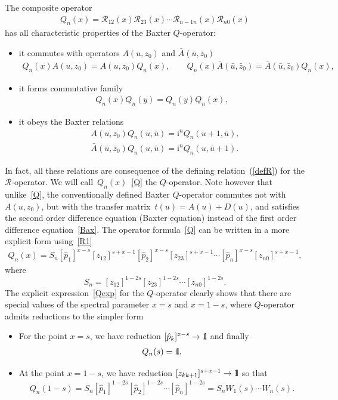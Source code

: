 \documentclass[pdftex]{sigma}
\renewcommand{\imath}{\mathrm{i}}
\newcommand{\II}{\hbox{{1}\kern-.25em\hbox{l}}}
\numberwithin{equation}{section}
\begin{document}
The composite operator
\begin{align}\label{Q}
Q_n(x) =
\mathcal{R}_{12}(x) \mathcal{R}_{23}(x)\cdots
\mathcal{R}_{n-1 n}(x) \mathcal{R}_{n 0}(x)
\end{align}
has all characteristic properties of the Baxter $Q$-operator:
\begin{itemize}\itemsep=0pt
\item
it commutes with operators $A(u,z_0)$ and
$\bar{A}(\bar{u},\bar{z}_0)$
\begin{align}\label{comQA}
Q_n(x) A(u,z_0) = A(u,z_0) Q_n(x) ,\qquad
Q_n(x) \bar{A}(\bar{u},\bar{z}_0) =
\bar{A}(\bar{u},\bar{z}_0) Q_n(x),
\end{align}
\item it forms commutative family
\begin{align}\label{comQQ}
Q_n(x) Q_n(y) = Q_n(y) Q_n(x),
\end{align}
\item it obeys the Baxter relations
\begin{align}\label{Bax}
&A(u,z_0) Q_n(u,\bar{u}) = \imath^n Q_n(u+1,\bar{u}),
\\
\label{Baxbar}
&\bar{A}(\bar{u},\bar{z}_0) Q_n(u,\bar{u}) = \imath^n Q_n(u,\bar{u}+1).
\end{align}
\end{itemize}
In fact, all these relations are consequence of the defining
relation~(\ref{defR}) for the $\mathcal{R}$-operator.
We will call~$Q_n(x)$~\eqref{Q} the $Q$-operator.
Note however that unlike~\eqref{Q}, the conventionally defined Baxter $Q$-operator commutes not with~$A(u,z_0)$, but with the transfer matrix~$t(u)=A(u)+D(u)$,
and satisfies the second order difference equation (Baxter equation) instead of the first order difference equation~\eqref{Bax}.
The operator formula~\eqref{Q} can be written in a more explicit form using~\eqref{R1}
\begin{align}\label{Qexp}
Q_n( x) = S_n
[\hat{p}_1]^{x-s} [z_{12}]^{s+x-1}
[\hat{p}_2]^{x-s} [z_{23}]^{s+x-1}
\cdots
[\hat{p}_n]^{x-s} [z_{n0}]^{s+x-1},
\end{align}
where
\begin{equation} \label{Sn}
S_n = [z_{12}]^{1-2s} [z_{23}]^{1-2s}
\cdots [z_{n0}]^{1-2s} .
\end{equation}
The explicit expression~\eqref{Qexp} for the $Q$-operator
clearly shows that there are special values of the spectral
parameter $x=s$ and $x=1-s$, where $Q$-operator admits
reductions to the simpler form
\begin{itemize}\itemsep=0pt
\item For the point $x=s$, we have reduction $[\hat{p}_k]^{x-s} \to \II$ and finally
\begin{align*}
Q_n(s) = \II.
\end{align*}
\item
At the point $x=1-s$, we have reduction $[z_{k k+1}]^{s+x-1}\to \II$ so that
\begin{align}\label{Q_1-s}
Q_n(1-s) = S_n
[\hat{p}_1]^{1-2s}
[\hat{p}_2]^{1-2s}
\cdots
[\hat{p}_n]^{1-2s} =
S_n W_1(s) \cdots W_n(s).
\end{align}
\end{itemize}
\end{document}
